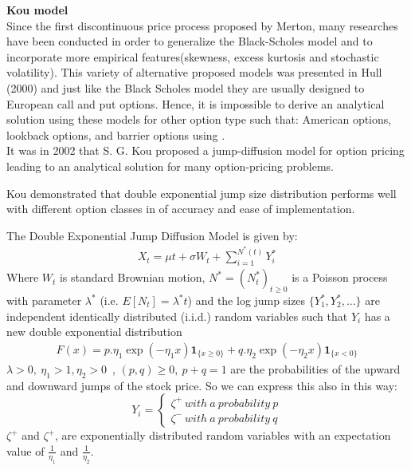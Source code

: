 \documentclass[12pt]{report}
\begin{document}
\large\textbf{Kou model}\\

Since the first discontinuous price process proposed by Merton, many researches have been conducted in order to generalize the Black-Scholes model and to incorporate more empirical features(skewness, excess kurtosis and stochastic volatility). This variety of alternative proposed models was presented in Hull (2000) and just like the Black Scholes model they are usually designed to European call and put options.
Hence, it is impossible to derive an analytical solution using these models for other option type such that: American options, lookback options, and barrier options using  .\\

It was in 2002 that S. G. Kou  proposed a jump-diffusion model for option pricing leading to an analytical solution for many option-pricing problems.

Kou demonstrated that double exponential jump size distribution performs well with different option classes  in  of accuracy and ease of implementation.

The Double Exponential Jump Diffusion Model is given by: 
\begin{gather}
X_t = \mu t+\sigma W_t+\sum_{i=1}^{N^*(t)} Y^*_i
\end{gather}
Where $W_t$ is  standard Brownian motion, $N^* =(N^*_t)_{t \geqslant 0}$ is a Poisson process with parameter $\lambda^*$ (i.e. $E[N_t] = \lambda^* t$) and the log jump sizes $\{Y^*_1 , Y^*_2 , ... \}$ are
independent identically distributed (i.i.d.) random variables such that $Y_i$ has a new double exponential distribution 
\begin{gather}
F(x)= p.\eta_1 \exp \left( -\eta_1 x \right) \mathbf{1}_{\{x\geqslant 0\}}+ q .\eta_2 \exp \left( -\eta_2 x \right) \mathbf{1}_{\{x < 0\}}
\end{gather}
$\lambda > 0,~ \eta_1 > 1, \eta_2 > 0$~,  
$(p,q) \geqslant 0,~ p+q=1$ are the probabilities of the upward and downward jumps of the stock price. So we can
express this also in this way:\\

         \[Y_i = \begin{cases} 
  \zeta^+ ~ with~ a~ probability ~ p \\
         \zeta^-  ~with ~ a ~ probability ~ q
         \end{cases}
          \]
$\zeta^+$ and $\zeta^+$, are exponentially distributed random variables with an expectation value of $\frac{1}{\eta_1}$ and $\frac{1}{\eta_2}$.\\
\end{document}
